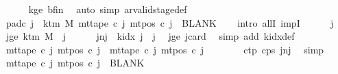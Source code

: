\begin{isabellebody}
\ \ \ \ \isamarkupfalse%
\ kge{}\ bf{\isacharunderscore}{\kern0pt}in\ \isamarkupfalse%
\ {\isacharparenleft}{\kern0pt}auto\ simp{\isacharcolon}{\kern0pt}\ ar{\isacharunderscore}{\kern0pt}valid{\isacharunderscore}{\kern0pt}stage{\isacharunderscore}{\kern0pt}def{\isacharparenright}{\kern0pt}\isanewline
\ \ \isamarkupfalse%
\ pad{\isacharunderscore}{\kern0pt}c{\isacharcolon}{\kern0pt}\ {\isachardoublequoteopen}{\isasymforall}j{\isacharprime}{\kern0pt}\ {\isasymge}\ k{\isacharunderscore}{\kern0pt}tm\ M{\isachardot}{\kern0pt}\ mt{\isacharunderscore}{\kern0pt}tape\ c\ j{\isacharprime}{\kern0pt}\ {\isacharparenleft}{\kern0pt}mt{\isacharunderscore}{\kern0pt}pos\ c\ j{\isacharprime}{\kern0pt}{\isacharparenright}{\kern0pt}\ {\isacharequal}{\kern0pt}\ BLANK{}{\isachardoublequoteclose}\isanewline
\ \ \isamarkupfalse%
\ {\isacharparenleft}{\kern0pt}intro\ allI\ impI{\isacharparenright}{\kern0pt}\isanewline
\ \ \ \ \isamarkupfalse%
\ j{\isacharprime}{\kern0pt}\ \isamarkupfalse%
\ jge{\isacharcolon}{\kern0pt}\ {\isachardoublequoteopen}k{\isacharunderscore}{\kern0pt}tm\ M\ {\isasymle}\ j{\isacharprime}{\kern0pt}{\isachardoublequoteclose}\isanewline
\ \ \ \ \isamarkupfalse%
\ jnj{\isacharcolon}{\kern0pt}\ {\isachardoublequoteopen}{\isasymnot}\ k{\isacharunderscore}{\kern0pt}idx\ j{\isacharprime}{\kern0pt}\ {\isacharless}{\kern0pt}\ j{\isachardoublequoteclose}\ \isamarkupfalse%
\ jge\ jcard\ \isamarkupfalse%
\ {\isacharparenleft}{\kern0pt}simp\ add{\isacharcolon}{\kern0pt}\ k{\isacharunderscore}{\kern0pt}idx{\isacharunderscore}{\kern0pt}def{\isacharparenright}{\kern0pt}\isanewline
\ \ \ \ \isamarkupfalse%
\ {\isachardoublequoteopen}mt{\isacharunderscore}{\kern0pt}tape\ c\ j{\isacharprime}{\kern0pt}\ {\isacharparenleft}{\kern0pt}mt{\isacharunderscore}{\kern0pt}pos\ c\ j{\isacharprime}{\kern0pt}{\isacharparenright}{\kern0pt}\ {\isacharequal}{\kern0pt}\ mt{\isacharunderscore}{\kern0pt}tape\ c{}\ j{\isacharprime}{\kern0pt}\ {\isacharparenleft}{\kern0pt}mt{\isacharunderscore}{\kern0pt}pos\ c{}\ j{\isacharprime}{\kern0pt}{\isacharparenright}{\kern0pt}{\isachardoublequoteclose}\isanewline
\ \ \ \ \ \ \isamarkupfalse%
\ c{\isacharunderscore}{\kern0pt}tp\ c{\isacharunderscore}{\kern0pt}ps\ jnj\ \isamarkupfalse%
\ simp\isanewline
\ \ \ \ \isamarkupfalse%
\ {\isachardoublequoteopen}mt{\isacharunderscore}{\kern0pt}tape\ c\ j{\isacharprime}{\kern0pt}\ {\isacharparenleft}{\kern0pt}mt{\isacharunderscore}{\kern0pt}pos\ c\ j{\isacharprime}{\kern0pt}{\isacharparenright}{\kern0pt}\ {\isacharequal}{\kern0pt}\ BLANK{}{\isachardoublequoteclose}\ \isamarkupfalse%

\end{isabellebody}
